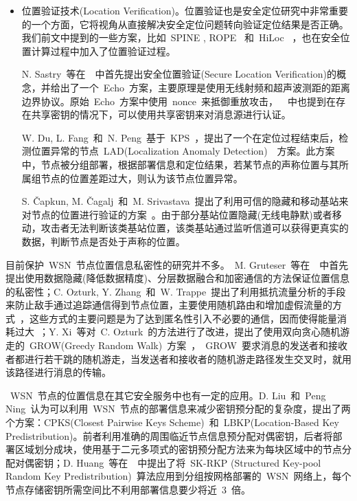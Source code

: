 \documentclass[a4paper,10pt]{article}
\begin{document}
\begin{itemize}
\item 位置验证技术(Location Verification)。位置验证也是安全定位研究中非常重要的一个方面，它将视角从直接解决安全定位问题转向验证定位结果是否正确。我们前文中提到的一些方案，比如~SPINE \cite{Lazos2005a}, ROPE \cite{Lazos2006}~和~HiLoc \cite{Lazos2005a}~，也在安全位置计算过程中加入了位置验证过程。

N. Sastry~等在~\cite{Sastry2003}~中首先提出安全位置验证(Secure Location Verification)的概念，并给出了一个~Echo~方案，主要原理是使用无线射频和超声波测距的距离边界协议。原始~Echo~方案中使用~nonce~来抵御重放攻击，~\cite{Sastry2003}~中也提到在存在共享密钥的情况下，可以使用共享密钥来对消息源进行认证。

W. Du, L. Fang~和~N. Peng~基于~KPS~\cite{Fang2005}，提出了一个在定位过程结束后，检测位置异常的节点~LAD(Localization Anomaly Detection)~\cite{Du2006}~方案。此方案中，节点被分组部署，根据部署信息和定位结果，若某节点的声称位置与其所属组节点的位置差距过大，则认为该节点位置异常。

S. \v{C}apkun, M. \v{C}agalj~和~M. Srivastava~提出了利用可信的隐藏和移动基站来对节点的位置进行验证的方案~\cite{Capkun2006a, Capkun2008}。由于部分基站位置隐藏(无线电静默)或者移动，攻击者无法判断该类基站位置，该类基站通过监听信道可以获得更真实的数据，判断节点是否处于声称的位置。

\end{itemize}

目前保护~WSN~节点位置信息私密性的研究并不多。~M. Gruteser~等在~\cite{Gruteser2003}~中首先提出使用数据隐藏(降低数据精度)、分层数据融合和加密通信的方法保证位置信息的私密性；C. Ozturk, Y. Zhang~和~W. Trappe~提出了利用抵抗流量分析的手段来防止敌手通过追踪通信得到节点位置，主要使用随机路由和增加虚假流量的方式~\cite{Ozturk2004}，这些方式的主要问题是为了达到匿名性引入不必要的通信，因而使得能量消耗过大~\cite{Xiao2006}；Y. Xi~等对~C. Ozturk~的方法进行了改进，提出了使用双向贪心随机游走的~GROW(Greedy Random Walk)~方案~\cite{Xi2006}，~GROW~要求消息的发送者和接收者都进行若干跳的随机游走，当发送者和接收者的随机游走路径发生交叉时，就用该路径进行消息的传输。

~WSN~节点的位置信息在其它安全服务中也有一定的应用。D. Liu~和~Peng Ning~认为可以利用~WSN~节点的部署信息来减少密钥预分配的复杂度，提出了两个方案：CPKS(Closest Pairwise Keys Scheme)~和~LBKP(Location-Based Key Predistribution)\cite{Liu2003}。前者利用准确的周围临近节点信息预分配对偶密钥，后者将部署区域划分成块，使用基于二元多项式的密钥预分配方法来为每块区域中的节点分配对偶密钥；D. Huang~等在~\cite{Huang2004}~中提出了将~SK-RKP (Structured Key-pool Random Key Predistribution)~算法应用到分组按网格部署的~WSN~网络上，每个节点存储密钥所需空间比不利用部署信息要少将近~3~倍。
\end{document}
